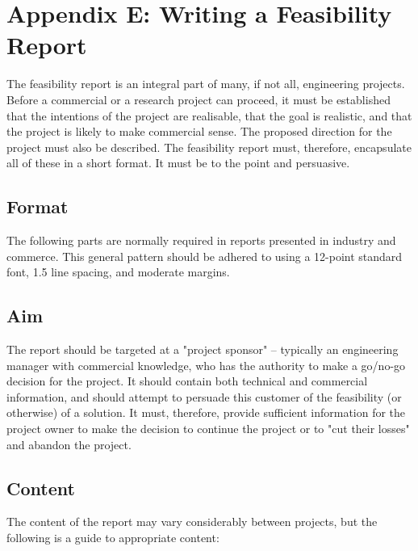 \documentclass[12pt]{article}
\begin{document}
\setcounter{page}{1}                                          %
\tableofcontents                                              %



\appendix
\section*{Appendix E: Writing a Feasibility Report}

The feasibility report is an integral part of many, if not all, engineering projects. Before a commercial or a research project can proceed, it must be established that the intentions of the project are realisable, that the goal is realistic, and that the project is likely to make commercial sense. The proposed direction for the project must also be described. The feasibility report must, therefore, encapsulate all of these in a short format. It must be to the point and persuasive.

\subsection*{Format}
The following parts are normally required in reports presented in industry and commerce. This general pattern should be adhered to using a 12-point standard font, 1.5 line spacing, and moderate margins.

\subsection*{Aim}
The report should be targeted at a "project sponsor" – typically an engineering manager with commercial knowledge, who has the authority to make a go/no-go decision for the project. It should contain both technical and commercial information, and should attempt to persuade this customer of the feasibility (or otherwise) of a solution. It must, therefore, provide sufficient information for the project owner to make the decision to continue the project or to "cut their losses" and abandon the project.

\subsection*{Content}
The content of the report may vary considerably between projects, but the following is a guide to appropriate content:
\end{document}
